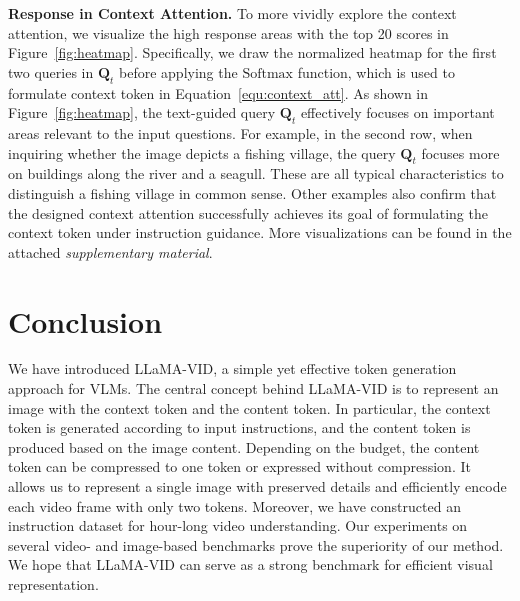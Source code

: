 \vspace{1.0em}
\noindent
\textbf{Response in Context Attention.}
To more vividly explore the context attention, we visualize the high response areas with the top 20 scores in Figure~\ref{fig:heatmap}.
Specifically, we draw the normalized heatmap for the first two queries in ${\mathbf Q}_t$ before applying the $\text{Softmax}$ function, which is used to formulate context token in Equation~\ref{equ:context_att}.
As shown in Figure~\ref{fig:heatmap}, the text-guided query ${\mathbf Q}_t$ effectively focuses on important areas relevant to the input questions.
For example, in the second row, when inquiring whether the image depicts a fishing village, the query ${\mathbf Q}_t$ focuses more on buildings along the river and a seagull.
These are all typical characteristics to distinguish a fishing village in common sense.
Other examples also confirm that the designed context attention successfully achieves its goal of formulating the context token under instruction guidance.
More visualizations can be found in the attached {\em supplementary material}.

\section{Conclusion}
We have introduced LLaMA-VID, a simple yet effective token generation approach for VLMs.
The central concept behind LLaMA-VID is to represent an image with the context token and the content token.
In particular, the context token is generated according to input instructions, and the content token is produced based on the image content.
Depending on the budget, the content token can be compressed to one token or expressed without compression.
It allows us to represent a single image with preserved details and efficiently encode each video frame with only two tokens.
Moreover, we have constructed an instruction dataset for hour-long video understanding.
Our experiments on several video- and image-based benchmarks prove the superiority of our method.
We hope that LLaMA-VID can serve as a strong benchmark for efficient visual representation.


